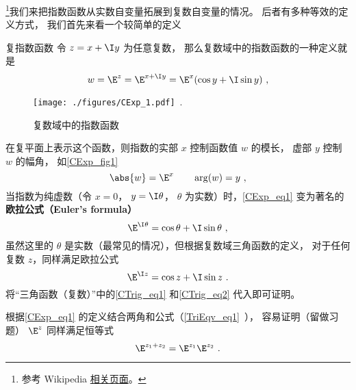 
\begin{issues}
\issueTODO
\end{issues}



\footnote{参考 Wikipedia \href{https://en.wikipedia.org/wiki/Euler's_formula}{相关页面}。}我们来把指数函数从实数自变量拓展到复数自变量的情况。 后者有多种等效的定义方式， 我们首先来看一个较简单的定义

\begin{definition}{复指数函数}
令 $z = x + \I y$ 为任意复数， 那么复数域中的指数函数的一种定义就是
\begin{equation}\label{CExp_eq1}
w = \E^z = \E^{x + \I y} = \E^x(\cos y + \I\sin y)~,
\end{equation}
\end{definition}

\begin{figure}[ht]
\centering
\texttt{[image: ./figures/CExp\_1.pdf]}~.
\caption{复数域中的指数函数} \label{CExp_fig1}
\end{figure}

在复平面上表示这个函数，则指数的实部 $x$ 控制函数值 $w$ 的模长， 虚部 $y$ 控制 $w$ 的幅角， 如\autoref{CExp_fig1}
 \begin{equation}
\abs{w} = \E^x \qquad \arg(w) = y~,
\end{equation}
当指数为纯虚数（令 $x = 0$， $y = \I\theta$， $\theta$ 为实数）时，\autoref{CExp_eq1} 变为著名的\textbf{欧拉公式（Euler's formula）}
\begin{equation}\label{CExp_eq2}
\E^{\I \theta} = \cos \theta + \I\sin \theta~,
\end{equation}
虽然这里的 $\theta$ 是实数（最常见的情况），但根据复数域三角函数的定义， 对于任何复数 $z$，同样满足欧拉公式
\begin{equation}
\E^{\I z} = \cos z + \I\sin z~.
\end{equation}
将“三角函数（复数）”中的\autoref{CTrig_eq1} 和\autoref{CTrig_eq2} 代入即可证明。

根据\autoref{CExp_eq1} 的定义结合两角和公式（\autoref{TriEqv_eq1}~）， 容易证明（留做习题） $\E^z$ 同样满足恒等式
\begin{equation}
\E^{z_1 + z_2} = \E^{z_1}\E^{z_2}~.
\end{equation}

